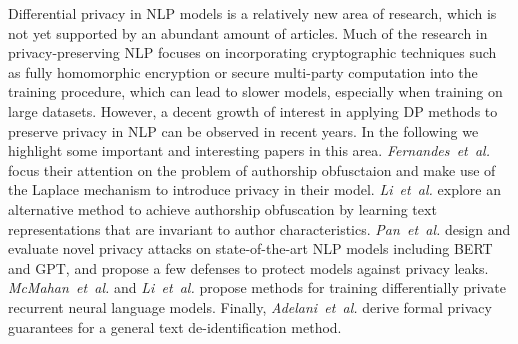 \documentclass{article}
\begin{document}
Differential privacy in NLP models is a relatively new area of research, 
which is not yet supported by an abundant amount of articles.
Much of the research in privacy-preserving NLP focuses on incorporating
cryptographic techniques such as fully homomorphic encryption \cite{badawi2019privft} or
secure multi-party computation \cite{9099258} into the training procedure, 
which can lead to slower models, especially when training on large datasets.
However, a decent growth of interest in applying DP
methods to preserve privacy in NLP can be observed in recent years.
In the following we highlight some important and interesting papers in this area.
\textit{Fernandes~et~al.} \cite{fernandes2018author, fernandes2019generalised} focus their attention on the
problem of authorship obfusctaion and make use of the Laplace mechanism to introduce privacy in their model.
\textit{Li~et~al.} \cite{li2018towards} explore an alternative method to achieve
authorship obfuscation by learning text representations that are invariant to author characteristics.
\textit{Pan~et~al.} \cite{pan2020privacy} design and evaluate novel privacy attacks 
on state-of-the-art NLP models including BERT and GPT, and propose a few defenses to protect
models against privacy leaks.
\textit{McMahan~et~al.} \cite{mcmahan2017learning} and \textit{Li~et~al.} \cite{li2019dp} propose methods
for training differentially private recurrent neural language models. 
Finally, \textit{Adelani~et~al.} \cite{adelani2020privacy} derive formal privacy guarantees
for a general text de-identification method.

\newpage


\end{document}
